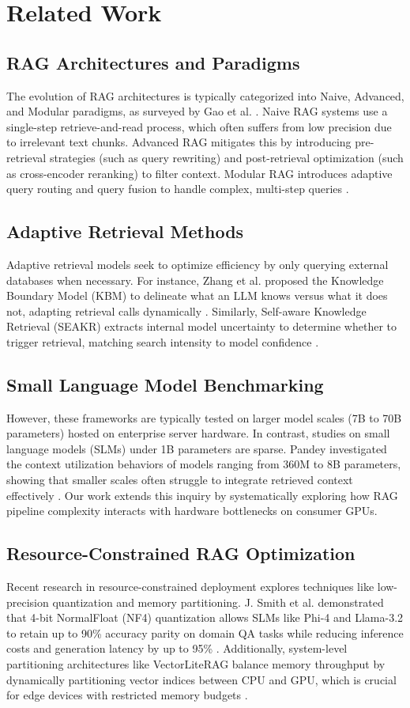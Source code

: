\documentclass[conference]{IEEEtran}
\begin{document}
\section{Related Work}
\subsection{RAG Architectures and Paradigms}
The evolution of RAG architectures is typically categorized into Naive, Advanced, and Modular paradigms, as surveyed by Gao et al. \cite{gao2023retrieval}. Naive RAG systems use a single-step retrieve-and-read process, which often suffers from low precision due to irrelevant text chunks. Advanced RAG mitigates this by introducing pre-retrieval strategies (such as query rewriting) and post-retrieval optimization (such as cross-encoder reranking) to filter context. Modular RAG introduces adaptive query routing and query fusion to handle complex, multi-step queries \cite{jeong2024adaptive}.
\subsection{Adaptive Retrieval Methods}
Adaptive retrieval models seek to optimize efficiency by only querying external databases when necessary. For instance, Zhang et al. proposed the Knowledge Boundary Model (KBM) to delineate what an LLM knows versus what it does not, adapting retrieval calls dynamically \cite{zhang2024kbm}. Similarly, Self-aware Knowledge Retrieval (SEAKR) extracts internal model uncertainty to determine whether to trigger retrieval, matching search intensity to model confidence \cite{yao2024seakr}.
\subsection{Small Language Model Benchmarking}
However, these frameworks are typically tested on larger model scales (7B to 70B parameters) hosted on enterprise server hardware. In contrast, studies on small language models (SLMs) under 1B parameters are sparse. Pandey investigated the context utilization behaviors of models ranging from 360M to 8B parameters, showing that smaller scales often struggle to integrate retrieved context effectively \cite{pandey2026empirical}. Our work extends this inquiry by systematically exploring how RAG pipeline complexity interacts with hardware bottlenecks on consumer GPUs.
\subsection{Resource-Constrained RAG Optimization}
Recent research in resource-constrained deployment explores techniques like low-precision quantization and memory partitioning. J. Smith et al. demonstrated that 4-bit NormalFloat (NF4) quantization allows SLMs like Phi-4 and Llama-3.2 to retain up to 90\% accuracy parity on domain QA tasks while reducing inference costs and generation latency by up to 95\% \cite{quantized_slm_2025}. Additionally, system-level partitioning architectures like VectorLiteRAG balance memory throughput by dynamically partitioning vector indices between CPU and GPU, which is crucial for edge devices with restricted memory budgets \cite{vectorliterag_2025}.
\end{document}

